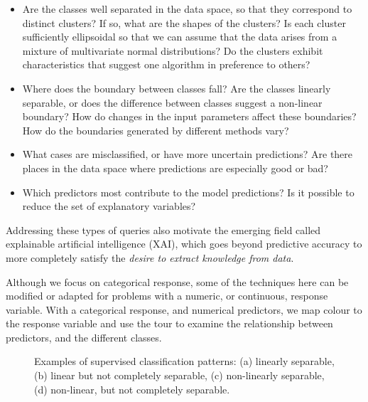 \documentclass[
  letterpaper,
]{krantz}
\providecommand{\tightlist}{%
  \setlength{\itemsep}{0pt}\setlength{\parskip}{0pt}}\usepackage{longtable,booktabs,array}
\begin{document}
\begin{itemize}
\tightlist
\item
  Are the classes well separated in the data space, so that they
  correspond to distinct clusters? If so, what are the shapes of the
  clusters? Is each cluster sufficiently ellipsoidal so that we can
  assume that the data arises from a mixture of multivariate normal
  distributions? Do the clusters exhibit characteristics that suggest
  one algorithm in preference to others?
\item
  Where does the boundary between classes fall? Are the classes linearly
  separable, or does the difference between classes suggest a non-linear
  boundary? How do changes in the input parameters affect these
  boundaries? How do the boundaries generated by different methods vary?
\item
  What cases are misclassified, or have more uncertain predictions? Are
  there places in the data space where predictions are especially good
  or bad?
\item
  Which predictors most contribute to the model predictions? Is it
  possible to reduce the set of explanatory variables?
\end{itemize}

Addressing these types of queries also motivate the emerging field
called explainable artificial intelligence (XAI), which goes beyond
predictive accuracy to more completely satisfy the \emph{desire to
extract knowledge from data}.

Although we focus on categorical response, some of the techniques here
can be modified or adapted for problems with a numeric, or continuous,
response variable. With a categorical response, and numerical
predictors, we map colour to the response variable and use the tour to
examine the relationship between predictors, and the different classes.

\begin{figure}


\caption{\label{fig-sup-example}Examples of supervised classification
patterns: (a) linearly separable, (b) linear but not completely
separable, (c) non-linearly separable, (d) non-linear, but not
completely separable.}

\end{figure}%
\end{document}
